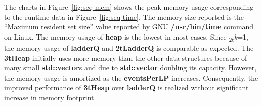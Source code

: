 The charts in Figure~\ref{fig:seq-mem} shows the peak memory usage corresponding to the runtime data in Figure~\ref{fig:seq-time}. The
memory size reported is the ``Maximum resident set size'' value reported by GNU \textbf{/usr/bin/time} command on Linux. The memory usage
of \textbf{heap} is the lowest in most cases. Since \textsubscript{2t}\textit{k}=1, the memory usage of \textbf{ladderQ} and \textbf{2tLadderQ} is comparable as expected. The \textbf{3tHeap} initially uses more memory than the other data structures because of many small \textbf{std::vector}s and due to \textbf{std::vector} doubling its capacity.  However, the memory usage is amortized as the \textbf{eventsPerLP} increases. Consequently, the improved performance of \textbf{3tHeap} over \textbf{ladderQ} is realized without significant increase in memory footprint.

